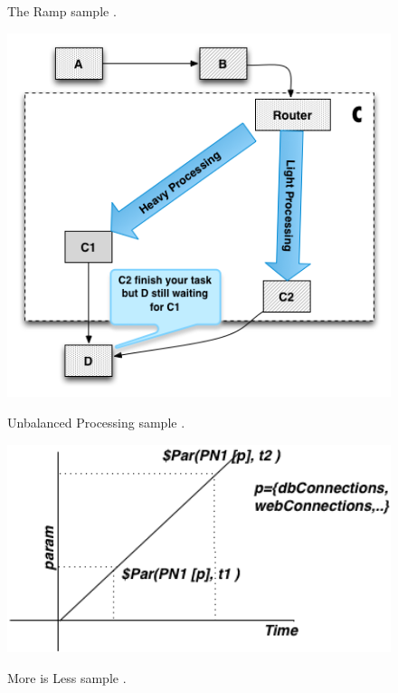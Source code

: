 \documentclass{report}
\begin{document}
\begin{figure}[!h]
\begin{minipage}{.5\textwidth}
\caption{The Ramp sample \cite{Vetoio2011}.}
\label{fig:ramp}
\end{minipage}
\begin{minipage}{.5\textwidth}
\centering
\includegraphics[width=1\textwidth]{./images/unbalanced.png}
\caption{Unbalanced Processing sample \cite{Wert2013a}. }
\label{fig:unbalanced}
\includegraphics[width=1\textwidth]{./images/moreisless.png}
\caption{More is Less sample \cite{Vetoio2011}.}
\label{fig:moreisless}
\end{minipage}
\end{figure}
\end{document}
